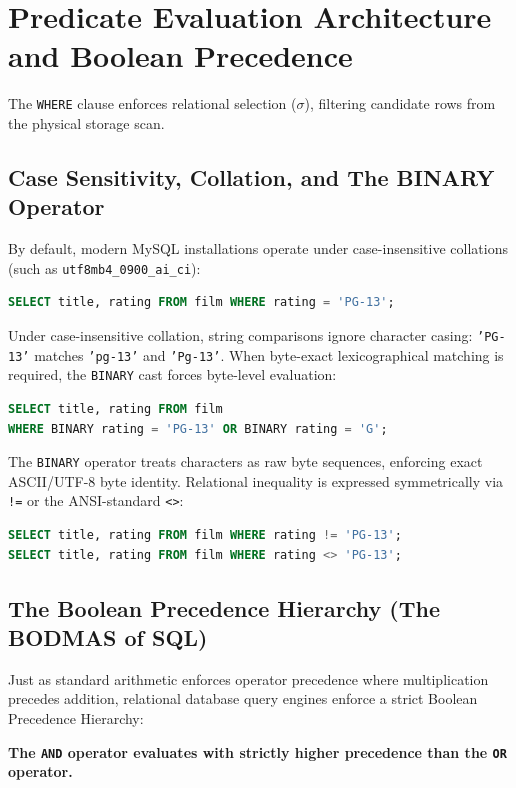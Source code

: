 \documentclass[10pt,twocolumn,letterpaper]{article}
\begin{document}
\section{Predicate Evaluation Architecture and Boolean Precedence}
\label{sec:filtering}

The \texttt{WHERE} clause enforces relational selection ($\sigma$), filtering candidate rows from the physical storage scan.

\subsection{Case Sensitivity, Collation, and The BINARY Operator}
By default, modern MySQL installations operate under case-insensitive collations (such as \texttt{utf8mb4\_0900\_ai\_ci}):
\begin{lstlisting}[language=SQL]
SELECT title, rating FROM film WHERE rating = 'PG-13';
\end{lstlisting}
Under case-insensitive collation, string comparisons ignore character casing: \texttt{'PG-13'} matches \texttt{'pg-13'} and \texttt{'Pg-13'}. When byte-exact lexicographical matching is required, the \texttt{BINARY} cast forces byte-level evaluation:
\begin{lstlisting}[language=SQL]
SELECT title, rating FROM film
WHERE BINARY rating = 'PG-13' OR BINARY rating = 'G';
\end{lstlisting}
The \texttt{BINARY} operator treats characters as raw byte sequences, enforcing exact ASCII/UTF-8 byte identity. Relational inequality is expressed symmetrically via \texttt{!=} or the ANSI-standard \texttt{<>}:
\begin{lstlisting}[language=SQL]
SELECT title, rating FROM film WHERE rating != 'PG-13';
SELECT title, rating FROM film WHERE rating <> 'PG-13';
\end{lstlisting}

\subsection{The Boolean Precedence Hierarchy (The BODMAS of SQL)}
Just as standard arithmetic enforces operator precedence where multiplication precedes addition, relational database query engines enforce a strict Boolean Precedence Hierarchy:
\begin{center}
\textbf{The \texttt{AND} operator evaluates with strictly higher precedence than the \texttt{OR} operator.}
\end{center}
\end{document}
